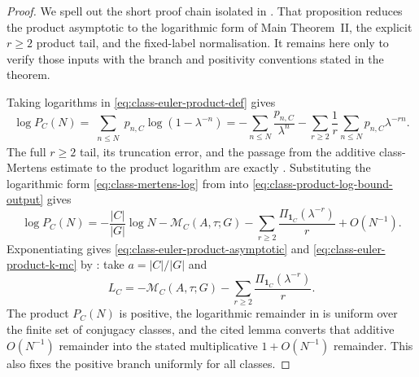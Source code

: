 \documentclass[11pt,a4paper]{amsart}
\theoremstyle{plain}
\theoremstyle{definition}
\theoremstyle{remark}
\begin{document}
\begin{proof}
  We spell out the short proof chain isolated in
  .  That proposition
  reduces the product asymptotic to the logarithmic form of Main Theorem~II,
  the explicit \(r\ge2\) product tail, and the fixed-label normalisation.
  It remains here only to verify those inputs with the branch and positivity
  conventions stated in the theorem.

  Taking logarithms in \eqref{eq:class-euler-product-def} gives
  \[
    \log P_C(N)
    =
    \sum_{\substack{n\le N}}
      p_{n,C}\log(1-\lambda^{-n})
    =
    -\sum_{n\le N}\frac{p_{n,C}}{\lambda^n}
      -
      \sum_{r\ge2}\frac{1}{r}
        \sum_{n\le N}p_{n,C}\lambda^{-rn}.
  \]
  The full \(r\ge2\) tail, its truncation error, and the passage from the
  additive class-Mertens estimate to the product logarithm are exactly
  .  Substituting the logarithmic
  form \eqref{eq:class-mertens-log} from 
  into \eqref{eq:class-product-log-bound-output} gives
  \[
    \log P_C(N)
    =
    -\frac{|C|}{|G|}\log N
    -\mathcal M_C(A,\tau;G)
    -\sum_{r\ge2}\frac{\Pi_{\mathbf1_C}(\lambda^{-r})}{r}
    +O(N^{-1}).
  \]
  Exponentiating gives \eqref{eq:class-euler-product-asymptotic} and
  \eqref{eq:class-euler-product-k-mc} by
  : take
  \(a=|C|/|G|\) and
  \[
    L_C=-\mathcal M_C(A,\tau;G)
    -\sum_{r\ge2}\frac{\Pi_{\mathbf1_C}(\lambda^{-r})}{r}.
  \]
  The product \(P_C(N)\) is positive, the logarithmic remainder in
   is uniform over the finite set of
  conjugacy classes, and the cited lemma converts that additive
  \(O(N^{-1})\) remainder into the stated multiplicative
  \(1+O(N^{-1})\) remainder.  This also fixes the positive branch uniformly for
  all classes.


\end{proof}
\end{document}
